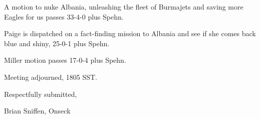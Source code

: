 \documentclass[10pt]{article}
\newcommand{\ps}{ plus Spehn\xspace}
\begin{document}
A motion to nuke Albania, unleashing the fleet of Burmajets and saving
more Eagles for us passes 33-4-0\ps.

Paige is dispatched on a fact-finding mission to Albania and see if
she comes back blue and shiny, 25-0-1\ps.

Miller motion passes 17-0-4\ps.

\vspace{12pt}

\noindent
Meeting adjourned, 1805 SST.

\vspace{18pt}

\centerline{Respectfully submitted,}
\centerline{Brian Sniffen, Onseck}
\end{document}
